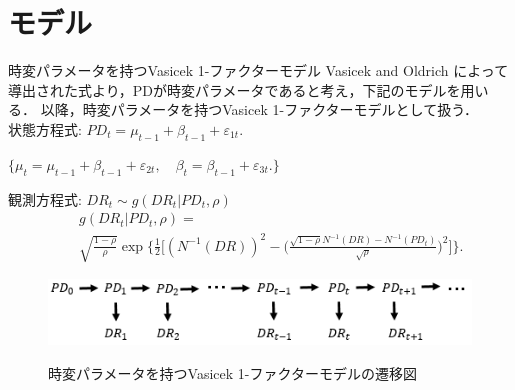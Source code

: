 \documentclass[dvipdfmx]{beamer}
\begin{document}
\section{モデル}
\begin{frame}{時変パラメータを持つVasicek 1-ファクターモデル}
Vasicek and Oldrich によって導出された式より，PDが時変パラメータであると考え，下記のモデルを用いる．
以降，時変パラメータを持つVasicek 1-ファクターモデルとして扱う．\\
状態方程式:
$PD_t=\mu_{t-1}+\beta_{t-1}+\varepsilon_{1t}$.\\
\begin{center}$\{\mu_t=\mu_{t-1}+\beta_{t-1}+\varepsilon_{2t},\quad\beta_t=\beta_{t-1}+\varepsilon_{3t}.\}$\end{center}
観測方程式:
$
DR_t\sim g(DR_t|PD_t,\rho)
$
\begin{eqnarray}
&&g(DR_t|PD_t,\rho)=\nonumber\\
&&\sqrt{\frac{1- {\rho}}{ {\rho}}} \exp\biggl\{ \frac{1}{2} \biggl[ (N^{-1}(DR))^2 - \biggl( \frac{\sqrt{1- {\rho}}N^{-1}(DR)-N^{-1}({PD_t})}{\sqrt{ {\rho}}}\biggr)^2\biggr]\biggr\}.\nonumber
\end{eqnarray}
\begin{figure}[h]
\begin{center}
  \includegraphics[scale=0.8]{figure/状態空間モデル2.png} \\
\caption{時変パラメータを持つVasicek 1-ファクターモデルの遷移図}
\label{fig:時変パラメータを持つVasicek 1-ファクターモデルの遷移図}
\end{center}
\end{figure}
\end{frame}
\end{document}
